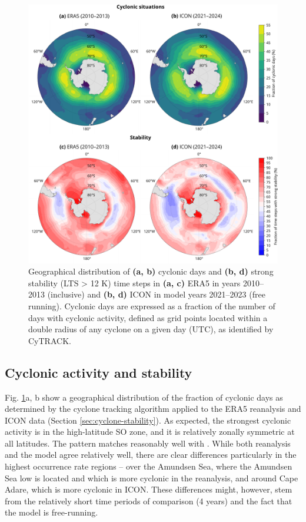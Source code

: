 \documentclass[12pt,a4paper]{article}
\begin{document}
\begin{figure}[p!]
\centering
\includegraphics[width=\textwidth]{img/cyc_stab_dist.pdf}
\caption{
Geographical distribution of \textbf{(a, b)} cyclonic days and \textbf{(b, d)}
strong stability (LTS > 12 K) time steps in \textbf{(a, c)} ERA5 in years
2010--2013 (inclusive) and \textbf{(b, d)} ICON in model years 2021--2023 (free
running). Cyclonic days are expressed as a fraction of the number of days with
cyclonic activity, defined as grid points located within a double radius of any
cyclone on a given day (UTC), as identified by CyTRACK.
}
\label{fig:cyclone-stability}
\end{figure}

\subsection{Cyclonic activity and stability}

Fig. \ref{fig:cyclone-stability}a, b show a geographical distribution of the
fraction of cyclonic days as determined by the cyclone tracking algorithm
applied to the ERA5 reanalysis and ICON data (Section
\ref{sec:cyclone-stability}). As expected, the strongest cyclonic activity is
in the high-latitude SO zone, and it is relatively zonally symmetric at all
latitudes.  The pattern matches reasonably well with \cite{hoskins2005}. While
both reanalysis and the model agree relatively well, there are clear
differences particularly in the highest occurrence rate regions -- over the
Amundsen Sea, where the Amundsen Sea low is located \cite{turner2013} and which
is more cyclonic in the reanalysis, and around Cape Adare, which is more
cyclonic in ICON. These differences might, however, stem from the relatively
short time periods of comparison (4 years) and the fact that the model is
free-running.
\end{document}

